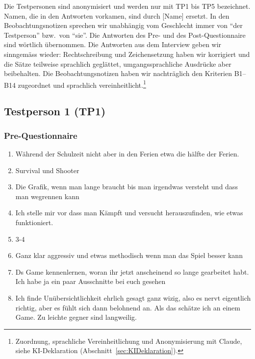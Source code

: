 \documentclass[../Main.tex]{subfiles}
\begin{document}
Die Testpersonen sind anonymisiert und werden nur mit TP1 bis TP5 bezeichnet. Namen, die in den Antworten vorkamen, sind durch [Name] ersetzt. In den Beobachtungsnotizen sprechen wir unabhängig vom Geschlecht immer von \enquote{der Testperson} bzw.\ von \enquote{sie}. Die Antworten des Pre- und des Post-Questionnaire sind wörtlich übernommen. Die Antworten aus dem Interview geben wir sinngemäss wieder: Rechtschreibung und Zeichensetzung haben wir korrigiert und die Sätze teilweise sprachlich geglättet, umgangssprachliche Ausdrücke aber beibehalten. Die Beobachtungsnotizen haben wir nachträglich den Kriterien B1--B14 zugeordnet und sprachlich vereinheitlicht.\footnote{Zuordnung, sprachliche Vereinheitlichung und Anonymisierung mit Claude, siehe KI-Deklaration (Abschnitt~\ref{sec:KIDeklaration}).}

\subsection{Testperson 1 (TP1)}

\subsubsection{Pre-Questionnaire}

\begin{enumerate}[label=\textbf{P\arabic*}, leftmargin=1.5cm, itemsep=0.5em]
    \item Während der Schulzeit nicht aber in den Ferien etwa die hälfte der Ferien.
    \item Survival und Shooter
    \item Die Grafik, wenn man lange braucht bis man irgendwas versteht und dass man wegrennen kann
    \item Ich stelle mir vor dass man Kämpft und versucht herauszufinden, wie etwas funktioniert.
    \item 3-4
    \item Ganz klar aggressiv und etwas methodisch wenn man das Spiel besser kann
    \item Ds Game kennenlernen, woran ihr jetzt anscheinend so lange gearbeitet habt. Ich habe ja ein paar Ausschnitte bei euch gesehen
    \item Ich finde Unübersichtlichkeit ehrlich gesagt ganz wizig, also es nervt eigentlich richtig, aber es fühlt sich dann belohnend an. Als das schätze ich an einem Game. Zu leichte gegner sind langweilig.
\end{enumerate}
\end{document}
